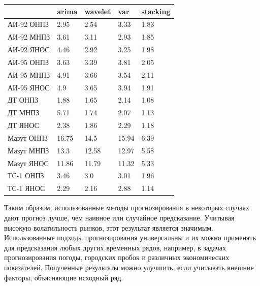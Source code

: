 \documentclass[a4paper,article,14pt]{extarticle}
\begin{document}
\begin{center}
        \begin{longtable}{|p{3.5cm}|p{2cm}|p{2cm}|p{2cm}|p{2cm}|}
            \hline
        \textbf{} & \textbf{arima} & \textbf{wavelet} & \textbf{var} & \textbf{stacking} \\
        \hline
        АИ-92 ОНПЗ & 2.95 & 2.54 & 3.33 & 1.83 \\
        \hline
        АИ-92 МНПЗ & 3.61 & 3.11 & 2.93 & 1.85 \\
        \hline
        АИ-92 ЯНОС & 4.46 & 2.92 & 3.25 & 1.98 \\
        \hline
        АИ-95 ОНПЗ & 3.63 & 3.39 & 3.81 & 2.05 \\
        \hline
        АИ-95 МНПЗ & 4.91 & 3.66 & 3.54 & 2.11 \\
        \hline
        АИ-95 ЯНОС & 4.9 & 3.65 & 3.94 & 1.91 \\
        \hline
        ДТ ОНПЗ & 1.88 & 1.65 & 2.14 & 1.08 \\
        \hline
        ДТ МНПЗ & 5.71 & 1.74 & 2.07 & 1.13 \\
        \hline
        ДТ ЯНОС & 2.38 & 1.86 & 2.29 & 1.18 \\
        \hline
        Мазут ОНПЗ & 16.75 & 14.5 & 15.94 & 6.39 \\
        \hline
        Мазут МНПЗ & 13.3 & 12.58 & 12.97 & 5.58 \\
        \hline
        Мазут ЯНОС & 11.86 & 11.79 & 11.32 & 5.33 \\
        \hline
        ТС-1 ОНПЗ & 3.46 & 3.0 & 3.01 & 1.96 \\
        \hline
        ТС-1 ЯНОС & 2.29 & 2.16 & 2.88 & 1.14 \\
        \hline
    \end{longtable}
    \label{tab:exchange_results}
\end{center}

\pagebreak
{}

Таким образом, использованные методы прогнозирования в некоторых случаях дают прогноз лучше, чем наивное или случайное предсказание.
Учитывая высокую волатильность рынков, этот результат является значимым.
Использованные подходы прогнозирования универсальны и их можно применять для предсказания любых других временных рядов, например, в задачах прогнозирования погоды, городских пробок и различных экономических показателей.
Полученные результаты можно улучшить, если учитывать внешние факторы, объясняющие исходный ряд.
\end{document}

